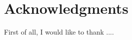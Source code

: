 \chapter*{Acknowledgments}
\label{cha:acknowledgments}

First of all, I would like to thank .... 
    
